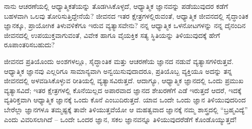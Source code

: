 
\newpage
\begin{mananam}{}
\nfntmtxt ನಾನು ಆಚರಣೆಯಲ್ಲಿ ಆಧ್ಯಾತ್ಮಿಕತೆಯನ್ನು ತೊಡಗಿಸಿಕೊಳ್ಳದೆ, ಆಧ್ಯಾತ್ಮಿಕ ಜ್ಞಾನವನ್ನು ಪಡೆಯುವುದರ ಕಡೆಗೆ ಬಹಳವಾಗಿ ಒಲವು ತೋರಿಸುತ್ತಿದ್ದೇನೆಯೆ? ಜೀವನದ ಇತರ ಕ್ಷೇತ್ರಗಳಲ್ಲಿರುವಂತೆ, ಆಧ್ಯಾತ್ಮಿಕ ಜೀವನದಲ್ಲಿ ಸೈದ್ಧಾಂತಿಕ ಜ್ಞಾನಕ್ಕೂ, ಪ್ರಾಯೋಗಿಕ ತಿಳುವಳಿಕೆಗೂ ಇರುವ ವ್ಯತ್ಯಾಸವೇನು? ನನ್ನ ಆಧ್ಯಾತ್ಮಿಕ ಒಳನೋಟಗಳನ್ನು ನನ್ನ ದೈನಂದಿನ ಜೀವನದಲ್ಲಿ ಉಪಯುಕ್ತವಾಗುವಂತೆ, ವಿವೇಕ ಹಾಗೂ ವೈಯಕ್ತಿಕ ಸತ್ಯ ಸ್ಥಿತಿಯನ್ನು ತಿಳಿಯುವುದಕ್ಕೆ  ಹೇಗೆ ರೂಪಾಂತರಿಸಬಹುದು? 
\end{mananam}
\sReflect
\begin{inspiration}{}
\nfntmtxt ಜೀವನದ ಪ್ರತಿಯೊಂದು ಅಂಶಗಳಲ್ಲೂ, ಸೈದ್ಧಾಂತಿಕ ಮತ್ತು ಆಚರಣೆಯ ಜ್ಞಾನದ ನಡುವೆ ವ್ಯತ್ಯಾಸಗಳಿರುತ್ತವೆ. ಆಧ್ಯಾತ್ಮಿಕ ಜ್ಞಾನವು ಎಲ್ಲರಿಗೂ ಸಾಮಾನ್ಯವಾಗಿ ಅನ್ವಯಿಸುವುದಾದರೂ, ಪ್ರತಿಯೊಬ್ಬ ವ್ಯಕ್ತಿಯೂ ಅದನ್ನು ತನ್ನ ಜೀವನದಲ್ಲಿ ಅಳವಡಿಸಿಕೊಳ್ಳುವ ರೀತಿಯಲ್ಲಿ ವ್ಯತ್ಯಾಸವಿರುತ್ತದೆ. ಆದಾಗ್ಯೂ, ಆಧ್ಯಾತ್ಮಿಕ ಜ್ಞಾನದಲ್ಲಿ ಒಂದು ಪ್ರಮುಖ ವ್ಯತ್ಯಾಸವಿದೆ; ಇತರ ಕ್ಷೇತ್ರಗಳಲ್ಲಿ ಕೊನೆಯಿಲ್ಲದ ಅಪಾರವಾದ ಜ್ಞಾನದ ಶೇಖರಣೆಗೆ ಎಡೆ ಇರುತ್ತದೆ ಆದರೆ, ಇದಕ್ಕೆ ವ್ಯತಿರಿಕ್ತವಾಗಿ ಆಧ್ಯಾತ್ಮಿಕ ಜ್ಞಾನಕ್ಕೆ ಒಂದು ಕೊನೆ ಎಂಬುದಿರುತ್ತದೆ.  ಯಾವ ಒಂದೇ ಒಂದು ಜ್ಞಾನ ತಿಳಿಯುವುದರಿಂದ ಬೇರೆಲ್ಲಾ ಜ್ಞಾನಗಳೂ ತಮ್ಮಷ್ಟಕ್ಕೆ ತಾವೇ ತಿಳಿಯುತ್ತವೆಯೋ ಆ ಮಹತ್ವವಾದ ಜ್ಞಾನಕ್ಕೆ ನಮ್ಮ ಶಾಸ್ತ್ರದಲ್ಲಿ “ಬ್ರಹ್ಮವಿದ್ಯೆ”  ಎಂದು  ವಿವರಿಸಲಾಗಿದೆ – ಒಂದೇ ಒಂದರ ಜ್ಞಾನ, ಸಕಲ ಜ್ಞಾನವನ್ನೂ ತಿಳಿಯುವುದರೆಡೆಗೆ ಕೊಂಡೊಯ್ಯುತ್ತದೆ!
\end{inspiration}
\newpage

